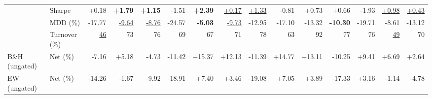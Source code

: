 \begin{table}[t]
{\begin{tabular}{llrrrrrrrrrrrrr}
 & Sharpe       & +0.18 & \textbf{+1.79} & \textbf{+1.15} & -1.51 & \textbf{+2.39} & \underline{+0.17} & \underline{+1.33} & -0.81 & +0.73 & +0.66 & -1.93 & \underline{+0.98} & \underline{+0.43} \\
 & MDD (\%)     & -17.77 & \underline{-9.64} & \underline{-8.76} & -24.57 & \textbf{-5.03} & \underline{-9.73} & -12.95 & -17.10 & -13.32 & \textbf{-10.30} & -19.71 & -8.61 & -13.12 \\
 & Turnover (\%)& \underline{46} & 73 & 76 & 69 & 67 & 71 & 78 & 63 & 92 & 77 & 76 & \underline{49} & 70 \\
\addlinespace
B\&H (ungated) & Net (\%)  & -7.16 & +5.18 & -4.73 & -11.42 & +15.37 & +12.13 & -11.39 & +14.77 & +13.11 & -10.25 & +9.41 & +6.69 & +2.64 \\
\addlinespace
EW (ungated) & Net (\%)  & -14.26 & -1.67 & -9.92 & -18.91 & +7.40 & +3.46 & -19.08 & +7.05 & +3.89 & -17.33 & +3.16 & -1.14 & -4.78 \\
\bottomrule
\end{tabular}%
}
\end{table}
